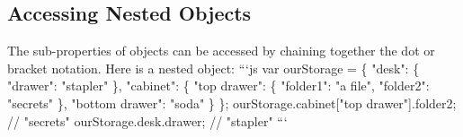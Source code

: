 \documentclass{article}%
\begin{document}
%
\subsection{Accessing Nested Objects}%
\label{subsec:AccessingNestedObjects}%
The sub{-}properties of objects can be accessed by chaining together the dot or bracket notation.\newline%
Here is a nested object:\newline%
```js\newline%
var ourStorage = \{\newline%
  "desk": \{\newline%
    "drawer": "stapler"\newline%
  \},\newline%
  "cabinet": \{\newline%
    "top drawer": \{ \newline%
      "folder1": "a file",\newline%
      "folder2": "secrets"\newline%
    \},\newline%
    "bottom drawer": "soda"\newline%
  \}\newline%
\};\newline%
ourStorage.cabinet{[}"top drawer"{]}.folder2;  // "secrets"\newline%
ourStorage.desk.drawer; // "stapler"\newline%
```\newline%

%
\end{document}
